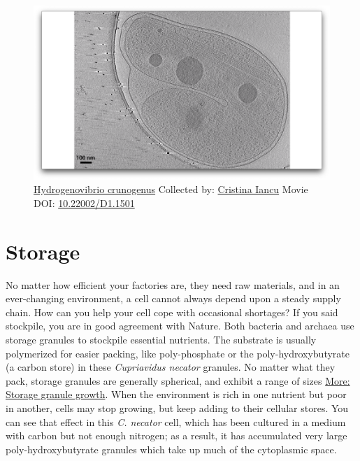 \documentclass[]{tufte-book}
\begin{document}
\begin{figure}
\includegraphics{movie_stills/4_7b} \caption[\protect\hyperlink{tree}{Hydrogenovibrio crunogenus}
Collected by: \protect\hyperlink{cristina_iancu}{Cristina Iancu} Movie
DOI: \href{https://doi.org/10.22002/D1.1501}{10.22002/D1.1501}]{\protect\hyperlink{tree}{Hydrogenovibrio crunogenus}
Collected by: \protect\hyperlink{cristina_iancu}{Cristina Iancu} Movie
DOI: \href{https://doi.org/10.22002/D1.1501}{10.22002/D1.1501}}\label{fig:4-7b}
\end{figure}

\section{Storage}\label{storage}

No matter how efficient your factories are, they need raw materials, and
in an ever-changing environment, a cell cannot always depend upon a
steady supply chain. How can you help your cell cope with occasional
shortages? If you said stockpile, you are in good agreement with Nature.
Both bacteria and archaea use storage granules to stockpile essential
nutrients. The substrate is usually polymerized for easier packing, like
poly-phosphate or the poly-hydroxybutyrate (a carbon store) in these
\emph{Cupriavidus necator} granules. No matter what they pack, storage
granules are generally spherical, and exhibit a range of sizes
\protect\hyperlink{Storage_granule_growth}{More: Storage granule
growth}. When the environment is rich in one nutrient but poor in
another, cells may stop growing, but keep adding to their cellular
stores. You can see that effect in this \emph{C. necator} cell, which
has been cultured in a medium with carbon but not enough nitrogen; as a
result, it has accumulated very large poly-hydroxybutyrate granules
which take up much of the cytoplasmic space.
\end{document}
